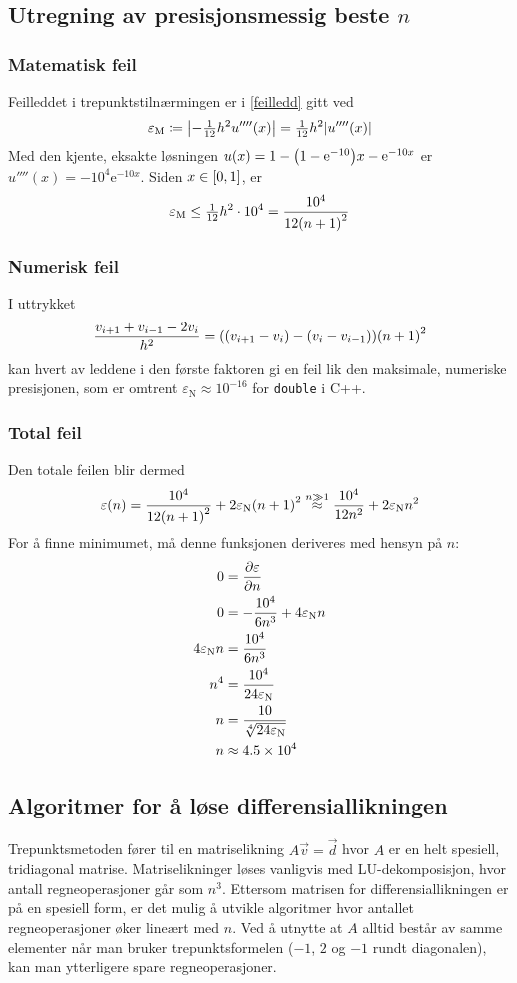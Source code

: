 \documentclass[12pt,norsk,a4paper]{report}
\renewcommand{\exp}[1]{\mathrm{e}^{#1}}
\begin{document}
\subsection{Utregning av presisjonsmessig beste \(n\)}\label{nregning}
\subsubsection{Matematisk feil}
Feilleddet i trepunktstilnærmingen er i \vref{feilledd} gitt ved
\[
\varepsilon_\mathrm{M} \coloneqq \abs{-\tfrac{1}{12}h^2u''''(x)} = \tfrac{1}{12}h^2\abs{u''''(x)}
\]
Med den kjente, eksakte løsningen \(u(x)=1-\qty(1-\exp{-10})x-\exp{-10x}\) er \(u''''(x)=-10^4\exp{-10x}\). Siden \(x\in\qty[0,1]\), er
\[
\varepsilon_\mathrm{M} \leq \tfrac{1}{12}h^2\cdot 10^4 = \frac{10^4}{12\qty(n+1)^2}
\]

\subsubsection{Numerisk feil}
I uttrykket
\[
\frac{v_{i+1}+v_{i-1}-2v_i}{h^2} = \qty(\qty(v_{i+1}-v_i)-\qty(v_i-v_{i-1}))\qty(n+1)^2
\]
kan hvert av leddene i den første faktoren gi en feil lik den maksimale, numeriske presisjonen, som er omtrent \(\varepsilon_\mathrm{N}\approx10^{-16}\) for \texttt{double} i C++.

\subsubsection{Total feil}
Den totale feilen blir dermed
\[
\varepsilon(n) = \frac{10^4}{12\qty(n+1)^2} + 2\varepsilon_\mathrm{N}\qty(n+1)^2 \overset{n\gg1}{\approx} \frac{10^4}{12n^2} + 2\varepsilon_\mathrm{N}n^2
\]
For å finne minimumet, må denne funksjonen deriveres med hensyn på \(n\):
\begin{alignat*}{2}
0 &= \pdv{\varepsilon}{n}\\
0 &= -\frac{10^4}{6n^3} + 4\varepsilon_\mathrm{N}n\\
4\varepsilon_\mathrm{N}n &= \frac{10^4}{6n^3}\\
n^4 &= \frac{10^4}{24\varepsilon_\mathrm{N}}\\
n &= \frac{10}{\sqrt[4]{24\varepsilon_\mathrm{N}}}\\
n &\approx \num{4.5e4}
\end{alignat*}




\subsection{Algoritmer for å løse differensiallikningen}
Trepunktsmetoden fører til en matriselikning \(A\vec{v}=\vec{d}\) hvor \(A\) er en helt spesiell, tridiagonal matrise. Matriselikninger løses vanligvis med LU-dekomposisjon, hvor antall regneoperasjoner går som \(n^3\)\autocite{compphys}. Ettersom matrisen for differensiallikningen er på en spesiell form, er det mulig å utvikle algoritmer hvor antallet regneoperasjoner øker lineært med \(n\). Ved å utnytte at \(A\) alltid består av samme elementer når man bruker trepunktsformelen (\(-1\), \(2\) og \(-1\) rundt diagonalen), kan man ytterligere spare regneoperasjoner.
\end{document}

